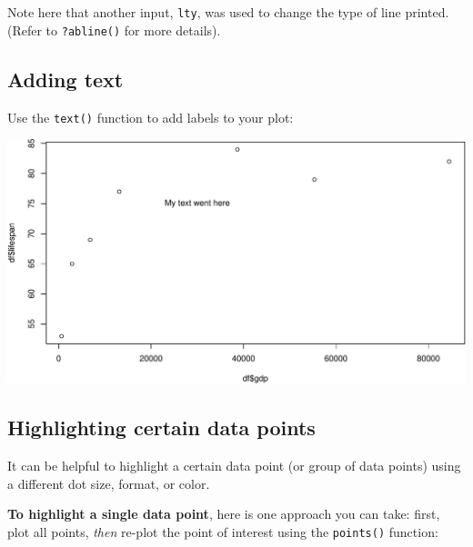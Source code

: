 \documentclass[]{book}
\newenvironment{Shaded}{\begin{snugshade}}{\end{snugshade}}
\newcommand{\DataTypeTok}[1]{\textcolor[rgb]{0.13,0.29,0.53}{#1}}
\newcommand{\DecValTok}[1]{\textcolor[rgb]{0.00,0.00,0.81}{#1}}
\newcommand{\KeywordTok}[1]{\textcolor[rgb]{0.13,0.29,0.53}{\textbf{#1}}}
\newcommand{\NormalTok}[1]{#1}
\newcommand{\OperatorTok}[1]{\textcolor[rgb]{0.81,0.36,0.00}{\textbf{#1}}}
\newcommand{\StringTok}[1]{\textcolor[rgb]{0.31,0.60,0.02}{#1}}
\begin{document}
Note here that another input, \texttt{lty}, was used to change the type of line printed. (Refer to \texttt{?abline()} for more details).

\hypertarget{adding-text}{%
\subsection*{Adding text}\label{adding-text}}

Use the \texttt{text()} function to add labels to your plot:

\begin{Shaded}
\end{Shaded}

\includegraphics{figures/unnamed-chunk-616-1.pdf}

\hypertarget{highlighting-certain-data-points}{%
\subsection*{Highlighting certain data points}\label{highlighting-certain-data-points}}

It can be helpful to highlight a certain data point (or group of data points) using a different dot size, format, or color.

\textbf{To highlight a single data point}, here is one approach you can take: first, plot all points, \emph{then} re-plot the point of interest using the \texttt{points()} function:
\end{document}
